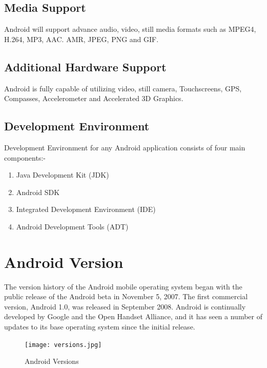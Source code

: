 \documentclass[twoside,a4paper,16pt]{book}
\begin{document}
\subsection{Media Support}
Android will support advance audio, video, still media formats such as MPEG4, H.264, MP3, AAC. AMR, JPEG, PNG and GIF.\\

\subsection{Additional Hardware Support}
Android is fully capable of utilizing video, still camera, Touchscreens, GPS, Compasses, Accelerometer and Accelerated 3D Graphics. \\

\subsection{Development Environment}
Development Environment for any Android application consists of four main components:-
\begin{enumerate}
\item Java Development Kit (JDK)
\item Android SDK
\item Integrated Development Environment (IDE)
\item Android Development Tools (ADT)
\end{enumerate}

\newpage
\section{Android Version}
The version history of the Android mobile operating system began with the public release of the Android beta in November 5, 2007. The first commercial version, Android 1.0, was released in September 2008. Android is continually developed by Google and the Open Handset Alliance, and it has seen a number of updates to its base operating system since the initial release.\\

\vspace{0.6cm}

\begin{figure}[ht!]
\begin{center}
\texttt{[image: versions.jpg]}
\caption{Android Versions}
\end{center}
\end{figure}
\end{document}
